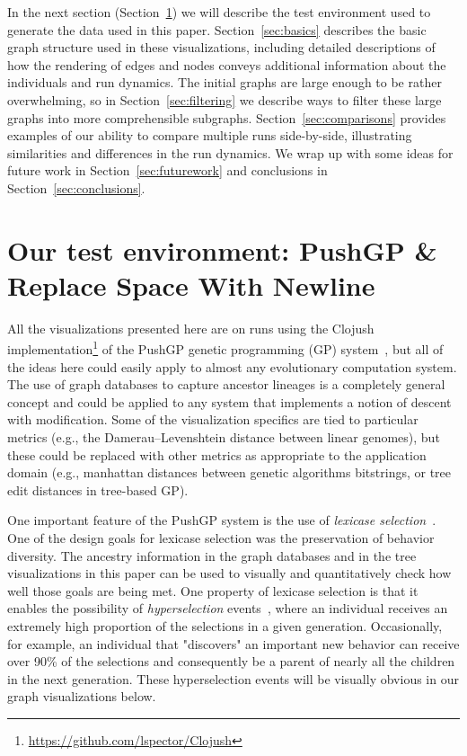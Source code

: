 \documentclass{sig-alternate}
\begin{document}
In the next section (Section~\ref{sec:testEnv}) we will describe the test
environment used to generate the data used in this paper. Section~\ref{sec:basics}
describes the basic graph structure used in these visualizations, including
detailed descriptions of how the rendering of edges and nodes conveys additional
information about the individuals and run dynamics. The initial graphs are large
enough to be rather overwhelming, so in Section~\ref{sec:filtering} we describe
ways to filter these large graphs into more comprehensible subgraphs. 
Section~\ref{sec:comparisons} provides examples of our ability to compare multiple
runs side-by-side, illustrating similarities and differences in the run dynamics.
We wrap up with some ideas for future work in Section~\ref{sec:futurework} and
conclusions in Section~\ref{sec:conclusions}.

\section{Our test environment: PushGP \& Replace Space With Newline}
\label{sec:testEnv}

All the visualizations presented here are on runs using the Clojush
implementation\footnote{\url{https://github.com/lspector/Clojush}} of the 
PushGP genetic programming (GP) system~\cite{1068292,spector:2002:GPEM}, 
but all of the ideas here
could easily apply to almost any evolutionary computation system. The use
of graph databases to capture ancestor lineages is a completely general
concept and could be applied to any system that implements a
notion of descent with modification. Some of the visualization specifics
are tied to particular metrics (e.g., the Damerau--Levenshtein distance
between linear genomes), but these could be replaced with other
metrics as appropriate to the application domain (e.g., manhattan distances
between genetic algorithms bitstrings, or tree edit distances in
tree-based GP).

One important feature of the PushGP system is the use of \emph{lexicase
selection}~\cite{Helmuth:2015:ieeeTEC}. One of the design goals for
lexicase selection was the preservation of behavior diversity. The
ancestry information in the graph databases and in the tree visualizations 
in this paper can be used to visually and quantitatively check how
well those goals are being met. One property of lexicase selection is
that it enables the possibility of \emph{hyperselection} events~\cite{Helmuth:2016:GECCO},
where an individual receives an extremely high proportion of the selections
in a given generation. Occasionally, for example, an individual that
"discovers" an important new behavior can receive over 90\% of the selections
and consequently be a parent of nearly all the children in the next generation.
These hyperselection events will be visually obvious in our graph visualizations
below.
\end{document}
